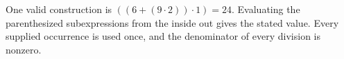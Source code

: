 One valid construction is $\boxed{((6+(9\cdot 2))\cdot 1)=24}$. Evaluating the parenthesized subexpressions from the inside out gives the stated value. Every supplied occurrence is used once, and the denominator of every division is nonzero.
